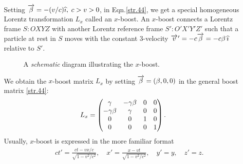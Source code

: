 \begin{small}
  Setting 
$\overrightarrow{{\beta}}=-(v/c){\widehat{\imath}},\; c>v>0$, in Eqn.\eqref{str.44}, we 
get a special homogeneous Lorentz transformation $L_x$ 
called an {$x$-boost}. An {$x$-boost} connects a Lorentz 
frame $S:OXYZ$ with another Lorentz reference 
frame $S':O'X'Y'Z'$ such that a particle at rest in $S$ 
moves with the {constant 3-velocity} ${\overrightarrow{v}\hspace*{.3pt}'} = -c 
\overrightarrow{{\beta}}= -c{\beta}\,{\widehat{\imath}}$ relative to  $S'$.

\begin{figure}[H]
\begin{center}
\end{center}
\caption{A \textsl{schematic} diagram illustrating the 
$x$-boost.}\label{fig4.3a}
\end{figure}
We obtain the $x$-boost matrix $L_x$ by setting  
$\overrightarrow{{\beta}}=({\beta},0,0)$  in the general boost 
matrix \eqref{str.44}:
\begin{align}\label{str.47}
L_x&=\begin{pmatrix}
{\gamma} &-{\gamma}{\beta}&0&0\\
 -{\gamma}{\beta}&{\gamma} &0 &0\\
0&0&1 &0\\0&0&0 &1\\
\end{pmatrix}.
\end{align}
Usually, $x$-boost is expressed in the more familiar format 
\begin{align}\label{str.48}
&ct'=\frac{ct-vx/c}{\sqrt{1-v^2/c^2}}, \quad x' 
=\frac{x-vt}{\sqrt{1-v^2/c^2}},\quad y' = y, \quad z'=z. 
\end{align}


\end{small}
